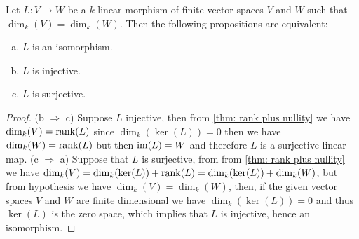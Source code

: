 \begin{corollary}\label{cor: equal dim - iso conditions}
  Let \(L : V \to W\) be a \(k\)-linear morphism of finite vector spaces \(V\)
  and \(W\) such that \(\dim_k(V) = \dim_k(W)\). Then the following propositions
  are equivalent:
  \begin{enumerate}[(a).]
    \item \(L\) is an isomorphism.
    \item \(L\) is injective.
    \item \(L\) is surjective.
  \end{enumerate}
\end{corollary}

\begin{proof}
  (b \(\Rightarrow\) c) Suppose \(L\) injective, then from \cref{thm: rank plus
  nullity} we have \(\dim_k(V) = \operatorname{rank}(L)\) since \(\dim_k(\ker(L)) = 0\) then
  we have \(\dim_k(W) = \operatorname{rank}(L)\) but then \(\operatorname{im}(L) = W\) and therefore \(L\)
  is a surjective linear map. (c \(\Rightarrow\) a) Suppose that \(L\) is
  surjective, from from \cref{thm: rank plus nullity} we have \(\dim_k(V) =
  \dim_k(\ker(L)) + \operatorname{rank}(L) = \dim_k(\ker(L)) + \dim_k(W)\), but from
  hypothesis we have \(\dim_k(V) = \dim_k(W)\), then, if the given vector spaces
  \(V\) and \(W\) are finite dimensional we have \(\dim_k(\ker(L)) = 0\) and
  thus \(\ker(L)\) is the zero space, which implies that \(L\) is injective,
  hence an isomorphism.
\end{proof}
